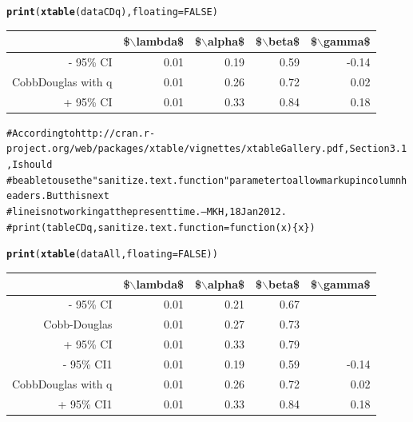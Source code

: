 \documentclass[10pt]{article}\usepackage{graphicx, color}
\makeatletter
\newcommand{\hlfunctioncall}[1]{\textcolor[rgb]{0.501960784313725,0,0.329411764705882}{\textbf{#1}}}%
\newcommand{\hlcomment}[1]{\textcolor[rgb]{0.180392156862745,0.6,0.341176470588235}{#1}}%
\newenvironment{kframe}{%
 \def\at@end@of@kframe{}%
 \ifinner\ifhmode%
  \def\at@end@of@kframe{\end{minipage}}%
  \begin{minipage}{\columnwidth}%
 \fi\fi%
 \def\FrameCommand##1{\hskip\@totalleftmargin \hskip-\fboxsep
 \colorbox{shadecolor}{##1}\hskip-\fboxsep
     \hskip-\linewidth \hskip-\@totalleftmargin \hskip\columnwidth}%
 \MakeFramed {\advance\hsize-\width
   \@totalleftmargin\z@ \linewidth\hsize
   \@setminipage}}%
 {\par\unskip\endMakeFramed%
 \at@end@of@kframe}
\makeatother
\begin{document}
\begin{kframe}
\begin{alltt}
\hlfunctioncall{print}(\hlfunctioncall{xtable}(dataCDq), floating=FALSE)
\end{alltt}
\end{kframe}%
\begin{tabular}{rrrrr}
  \hline
 & \$$\backslash$lambda\$ & \$$\backslash$alpha\$ & \$$\backslash$beta\$ & \$$\backslash$gamma\$ \\ 
  \hline
- 95\% CI & 0.01 & 0.19 & 0.59 & -0.14 \\ 
  CobbDouglas with q & 0.01 & 0.26 & 0.72 & 0.02 \\ 
  + 95\% CI & 0.01 & 0.33 & 0.84 & 0.18 \\ 
   \hline
\end{tabular}
\begin{kframe}\begin{alltt}
\hlcomment{# According to http://cran.r-project.org/web/packages/xtable/vignettes/xtableGallery.pdf, Section 3.1, I should }
\hlcomment{# be able to use the "sanitize.text.function" parameter to allow markup in column headers. But this next}
\hlcomment{# line is not working at the present time. --MKH, 18 Jan 2012.}
\hlcomment{# print(tableCDq, sanitize.text.function = function(x)\{x\})}

\hlfunctioncall{print}(\hlfunctioncall{xtable}(dataAll, floating=FALSE))
\end{alltt}
\end{kframe}%
\begin{table}[ht]
\begin{center}
\begin{tabular}{rrrrr}
  \hline
 & \$$\backslash$lambda\$ & \$$\backslash$alpha\$ & \$$\backslash$beta\$ & \$$\backslash$gamma\$ \\ 
  \hline
- 95\% CI & 0.01 & 0.21 & 0.67 &  \\ 
  Cobb-Douglas & 0.01 & 0.27 & 0.73 &  \\ 
  + 95\% CI & 0.01 & 0.33 & 0.79 &  \\ 
  - 95\% CI1 & 0.01 & 0.19 & 0.59 & -0.14 \\ 
  CobbDouglas with q & 0.01 & 0.26 & 0.72 & 0.02 \\ 
  + 95\% CI1 & 0.01 & 0.33 & 0.84 & 0.18 \\ 
   \hline
\end{tabular}
\end{center}
\end{table}
\end{document}
